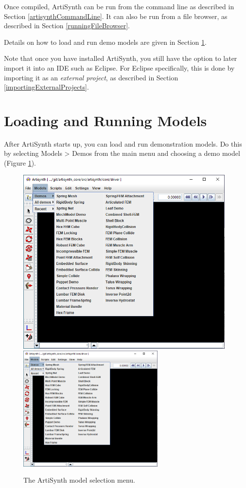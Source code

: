 Once compiled, ArtiSynth can be run from the command line as described
in Section \ref{artisynthCommandLine}.
\ifMacOS
It can also be run from a file browser, as described
in Section \ref{runningFileBrowser}.
\fi
%
\fi %

Details on how to load and run demo models are given in
Section \ref{Running}.

Note that once you have installed ArtiSynth, you still have the option
to later import it into an IDE such as Eclipse. For Eclipse
specifically, this is done by importing it as an {\it external
project}, as described in Section \ref{importingExternalProjects}.

\section{Loading and Running Models}
\label{Running}

After ArtiSynth starts up, you can load and run demonstration
models. Do this by selecting {\sf Models > Demos} from the main menu
and choosing a demo model (Figure \ref{ModelSelectionMenu:fig}).

\begin{figure}[ht]
\begin{center}
\iflatexml
   \includegraphics[]{images/ArtiSynthDemoMenu}
\else
   \includegraphics[width=0.65\textwidth]{images/ArtiSynthDemoMenu}
\fi
\end{center}
\caption{The ArtiSynth model selection menu.}
\label{ModelSelectionMenu:fig}
\end{figure}

